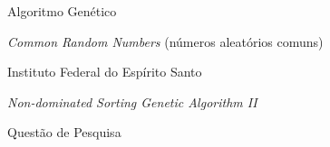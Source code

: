 \begin{siglas}
    \item[AG] Algoritmo Genético
    \item[CRN] \textit{Common Random Numbers} (números aleatórios comuns)
    \item[Ifes] Instituto Federal do Espírito Santo
    \item[NSGA-II] \textit{Non-dominated Sorting Genetic Algorithm II}
    \item[QP] Questão de Pesquisa
\end{siglas}
